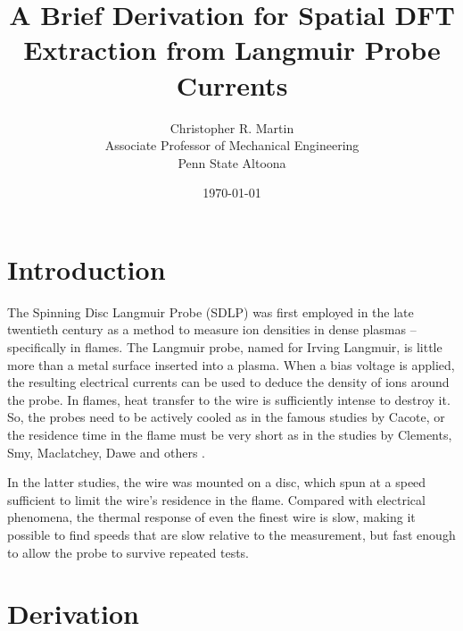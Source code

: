 \documentclass{article}
\title{A Brief Derivation for Spatial DFT Extraction from Langmuir Probe Currents}
\author{Christopher R. Martin\\Associate Professor of Mechanical Engineering\\Penn State Altoona}
\date{\today}
\begin{document}
\maketitle

\section{Introduction}

The Spinning Disc Langmuir Probe (SDLP) was first employed in the late twentieth century as a method to measure ion densities in dense plasmas -- specifically in flames.  The Langmuir probe, named for Irving Langmuir, is little more than a metal surface inserted into a plasma.  When a bias voltage is applied, the resulting electrical currents can be used to deduce the density of ions around the probe.  In flames, heat transfer to the wire is sufficiently intense to destroy it.  So, the probes need to be actively cooled as in the famous studies by Cacote\cite{}, or the residence time in the flame must be very short as in the studies by Clements, Smy, Maclatchey, Dawe and others \cite{}.  

In the latter studies, the wire was mounted on a disc, which spun at a speed sufficient to limit the wire's residence in the flame.  Compared with electrical phenomena, the thermal response of even the finest wire is slow, making it possible to find speeds that are slow relative to the measurement, but fast enough to allow the probe to survive repeated tests.

\section{Derivation}
\end{document}
